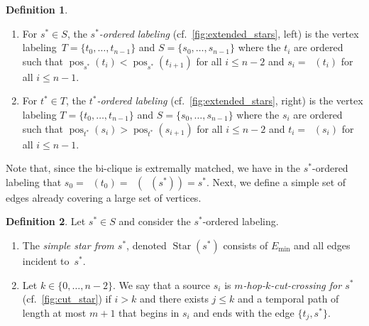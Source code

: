 \documentclass[11pt, letterpaper]{article}
\DeclareMathOperator{\pos}{pos}
\DeclareMathOperator{\minmat}{N_{\mathrm{min}}}
\DeclareMathOperator{\maxmat}{N_{\mathrm{max}}}
\renewcommand{\star}{\operatorname{Star}}
\newcommand{\minedges}{E_{\mathrm{min}}}
\theoremstyle{definition}
\newtheorem{definition}{Definition}
\theoremstyle{plain}
\begin{document}
\begin{definition}
\label{def:induced_labeling}
\leavevmode
\begin{enumerate}[topsep=2pt, label=(\alph*)]
\item 
\label{def:labeling_source}
For $s^* \in S$, the \emph{$s^*$-ordered labeling} (cf.~\cref{fig:extended_stars}, left) is the vertex labeling~$T = \{t_0, \dots, t_{n-1}\}$ and $S = \{s_0, \dots, s_{n-1}\}$  
where the $t_i$ are ordered such that
$\pos_{s^*}(t_i) < \pos_{s^*}(t_{i+1})$ for all $i\leq n-2$
and $s_i = \minmat(t_i)$ for all $i \leq n-1$.
\item 
\label{def:labeling_target}
For $t^* \in T$, the \emph{$t^*$-ordered labeling} (cf.~\cref{fig:extended_stars}, right) is the vertex labeling $T = \{t_0, \dots, t_{n-1}\}$ and $S = \{s_0, \dots, s_{n-1}\}$ 
where the $s_i$ are ordered such that 
$\pos_{t^*}(s_i)>\pos_{t^*}(s_{i+1})$ for all $i\leq n-2$ and
$t_i=\maxmat(s_i)$ for all $i\leq n-1$.
\end{enumerate}
\end{definition}


Note that, since the bi-clique is extremally matched, we have in the $s^*$-ordered labeling that $s_0=\minmat(t_0)=\minmat(\minmat(s^*))=s^*$.
Next, we define a simple set of edges already covering a large set of vertices.

\begin{definition}
\label{def:cut_crossing}
Let $s^*\in S$ and consider the $s^*$-ordered labeling.
\begin{enumerate}[label=(\roman*)]
\item The \emph{simple star from $s^*$}, denoted $\star(s^*)$ consists of $\minedges$ and all edges incident to~$s^*$.
\item Let $k\in \{0,\dots, n-2\}$. We say that a source $s_i$ is \emph{$m$-hop-$k$-cut-crossing for $s^*$} (cf.~\cref{fig:cut_star}) if $i>k$ and there exists $j\leq k$ and a temporal path of length at most $m+1$ that begins in $s_i$ and ends with the edge $\{t_j,s^*\}$.
\end{enumerate}
\end{definition}
\end{document}
